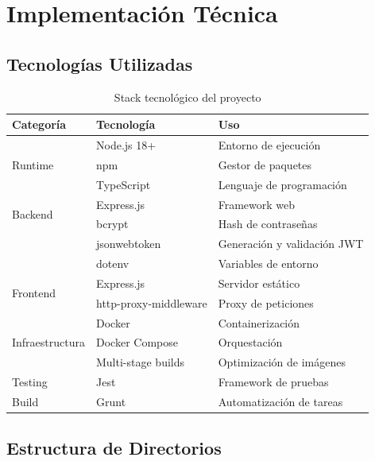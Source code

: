 \documentclass[12pt,a4paper]{article}
\begin{document}
\newpage

\section{Implementación Técnica}

\subsection{Tecnologías Utilizadas}

\begin{table}[H]
\centering
\begin{tabular}{|l|l|p{7cm}|}
\hline
\textbf{Categoría} & \textbf{Tecnología} & \textbf{Uso} \\
\hline
\multirow{3}{*}{Runtime} & Node.js 18+ & Entorno de ejecución \\
& npm & Gestor de paquetes \\
& TypeScript & Lenguaje de programación \\
\hline
\multirow{2}{*}{Backend} & Express.js & Framework web \\
& bcrypt & Hash de contraseñas \\
& jsonwebtoken & Generación y validación JWT \\
& dotenv & Variables de entorno \\
\hline
\multirow{2}{*}{Frontend} & Express.js & Servidor estático \\
& http-proxy-middleware & Proxy de peticiones \\
\hline
\multirow{3}{*}{Infraestructura} & Docker & Containerización \\
& Docker Compose & Orquestación \\
& Multi-stage builds & Optimización de imágenes \\
\hline
Testing & Jest & Framework de pruebas \\
\hline
Build & Grunt & Automatización de tareas \\
\hline
\end{tabular}
\caption{Stack tecnológico del proyecto}
\end{table}

\subsection{Estructura de Directorios}
\end{document}
